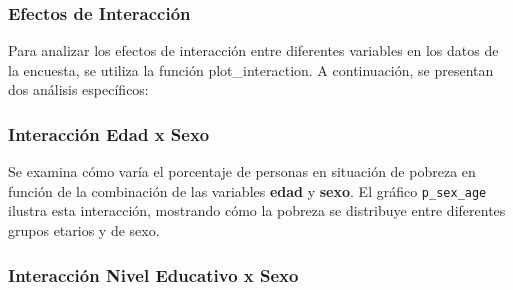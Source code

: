 \documentclass[
  12pt,
]{book}
\newenvironment{Shaded}{\begin{snugshade}}{\end{snugshade}}
\newcommand{\AlertTok}[1]{\textcolor[rgb]{0.94,0.16,0.16}{#1}}
\newcommand{\AttributeTok}[1]{\textcolor[rgb]{0.13,0.29,0.53}{#1}}
\newcommand{\CommentTok}[1]{\textcolor[rgb]{0.56,0.35,0.01}{\textit{#1}}}
\newcommand{\DocumentationTok}[1]{\textcolor[rgb]{0.56,0.35,0.01}{\textbf{\textit{#1}}}}
\newcommand{\FunctionTok}[1]{\textcolor[rgb]{0.13,0.29,0.53}{\textbf{#1}}}
\newcommand{\NormalTok}[1]{#1}
\newcommand{\OtherTok}[1]{\textcolor[rgb]{0.56,0.35,0.01}{#1}}
\newcommand{\SpecialCharTok}[1]{\textcolor[rgb]{0.81,0.36,0.00}{\textbf{#1}}}
\newcommand{\StringTok}[1]{\textcolor[rgb]{0.31,0.60,0.02}{#1}}
\begin{document}
\hypertarget{efectos-de-interacciuxf3n}{%
\subsubsection*{Efectos de Interacción}\label{efectos-de-interacciuxf3n}}

Para analizar los efectos de interacción entre diferentes variables en los datos de la encuesta, se utiliza la función plot\_interaction. A continuación, se presentan dos análisis específicos:

\hypertarget{interacciuxf3n-edad-x-sexo}{%
\subsubsection*{Interacción Edad x Sexo}\label{interacciuxf3n-edad-x-sexo}}

Se examina cómo varía el porcentaje de personas en situación de pobreza en función de la combinación de las variables \textbf{edad} y \textbf{sexo}. El gráfico \texttt{p\_sex\_age} ilustra esta interacción, mostrando cómo la pobreza se distribuye entre diferentes grupos etarios y de sexo.

\begin{Shaded}
\end{Shaded}

\hypertarget{interacciuxf3n-nivel-educativo-x-sexo}{%
\subsubsection*{Interacción Nivel Educativo x Sexo}\label{interacciuxf3n-nivel-educativo-x-sexo}}
\end{document}

